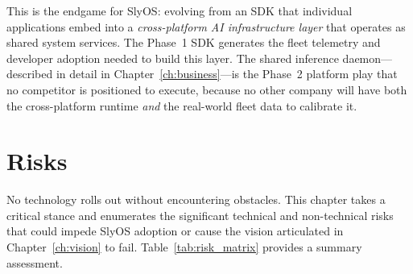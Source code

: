 \documentclass[12pt, letterpaper, twoside]{report}
\begin{document}
This is the endgame for SlyOS: evolving from an SDK that individual applications embed into a \textit{cross-platform AI infrastructure layer} that operates as shared system services. The Phase~1 SDK generates the fleet telemetry and developer adoption needed to build this layer. The shared inference daemon---described in detail in Chapter~\ref{ch:business}---is the Phase~2 platform play that no competitor is positioned to execute, because no other company will have both the cross-platform runtime \textit{and} the real-world fleet data to calibrate it.

\chapter{Risks}
\label{ch:risks}

No technology rolls out without encountering obstacles. This chapter takes a critical stance and enumerates the significant technical and non-technical risks that could impede SlyOS adoption or cause the vision articulated in Chapter~\ref{ch:vision} to fail. Table~\ref{tab:risk_matrix} provides a summary assessment.
\end{document}
